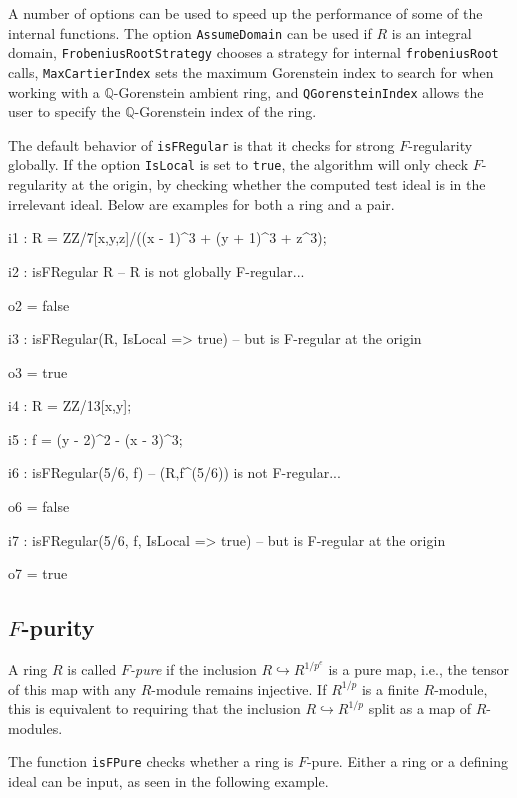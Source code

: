 \documentclass{amsart}
\begin{document}
A number of options can be used to speed up the performance of some of the
internal functions. The option \texttt{AssumeDomain} can be used if $R$ is an
integral domain, \texttt{FrobeniusRootStrategy} chooses a strategy for
internal \texttt{frobeniusRoot} calls, \texttt{MaxCartierIndex} sets the
maximum Gorenstein index to search for when working with a
$\mathbb{Q}$-Gorenstein ambient ring, and \texttt{QGorensteinIndex}
allows the user to specify the $\mathbb{Q}$-Gorenstein index of the ring.


The default behavior of \texttt{isFRegular} is that it checks for strong $F$-regularity
globally. If the option \texttt{IsLocal} is set to \texttt{true}, the algorithm will only
check $F$-regularity at the origin, by checking whether the computed test ideal is in the irrelevant ideal.
Below are examples for both a ring and a pair.


\medskip
{\small{}
\begin{MyVerbatim}
i1 : R = ZZ/7[x,y,z]/((x - 1)^3 + (y + 1)^3 + z^3);

i2 : isFRegular R -- R is not globally F-regular...

o2 = false

i3 : isFRegular(R, IsLocal => true) -- but is F-regular at the origin

o3 = true

i4 : R = ZZ/13[x,y];

i5 : f = (y - 2)^2 - (x - 3)^3;

i6 : isFRegular(5/6, f) -- (R,f^(5/6)) is not F-regular...

o6 = false

i7 : isFRegular(5/6, f, IsLocal => true) -- but is F-regular at the origin

o7 = true
\end{MyVerbatim}
}\medskip

\subsection{$F$-purity}
\begin{definition}
A ring $R$ is called \emph{$F$-pure} if
the inclusion $R \hookrightarrow R^{1/p^{e}}$ is a pure map, i.e.,
the tensor of this map with any $R$-module remains injective.  If $R^{1/p}$ is a finite $R$-module, this is equivalent to requiring that the inclusion $R \hookrightarrow R^{1/p}$ split as a map of $R$-modules.
\end{definition}

The function \texttt{isFPure} checks whether a ring is $F$-pure.
Either a ring or a defining ideal can be input, as seen in the following example.
\end{document}
